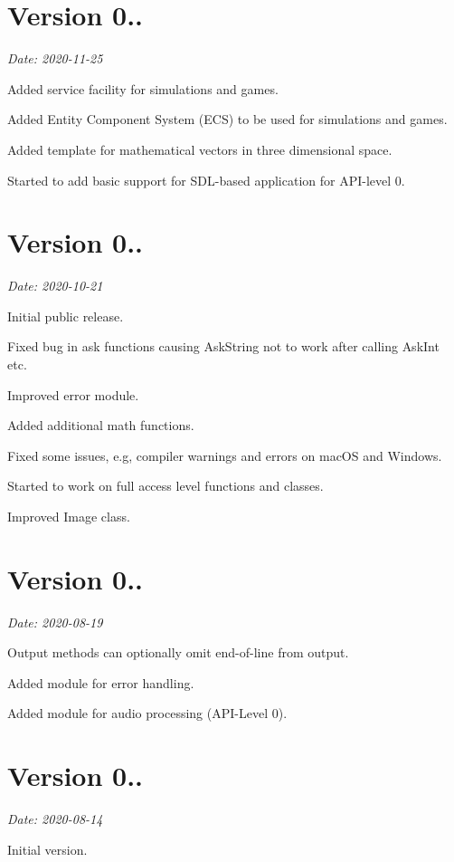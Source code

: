 \section*{Version 0..}

{\itshape Date\+: 2020-\/11-\/25}


\begin{DoxyItemize}
\item Added service facility for simulations and games.
\item Added Entity Component System (E\+CS) to be used for simulations and games.
\item Added template for mathematical vectors in three dimensional space.
\item Started to add basic support for S\+D\+L-\/based application for A\+P\+I-\/level 0.
\end{DoxyItemize}

\section*{Version 0..}

{\itshape Date\+: 2020-\/10-\/21}


\begin{DoxyItemize}
\item Initial public release.
\item Fixed bug in ask functions causing {\ttfamily Ask\+String} not to work after calling {\ttfamily Ask\+Int} etc.
\item Improved error module.
\item Added additional math functions.
\item Fixed some issues, e.\+g, compiler warnings and errors on mac\+OS and Windows.
\item Started to work on full access level functions and classes.
\item Improved Image class.
\end{DoxyItemize}

\section*{Version 0..}

{\itshape Date\+: 2020-\/08-\/19}


\begin{DoxyItemize}
\item Output methods can optionally omit end-\/of-\/line from output.
\item Added module for error handling.
\item Added module for audio processing (A\+P\+I-\/\+Level 0).
\end{DoxyItemize}

\section*{Version 0..}

{\itshape Date\+: 2020-\/08-\/14}


\begin{DoxyItemize}
\item Initial version. 
\end{DoxyItemize}